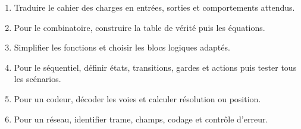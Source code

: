 \documentclass[10pt,a3paper]{article}
\begin{document}
\vfill
\begin{TLPosterMethode}
\begin{enumerate}
  \item Traduire le cahier des charges en entrées, sorties et comportements attendus.
  \item Pour le combinatoire, construire la table de vérité puis les équations.
  \item Simplifier les fonctions et choisir les blocs logiques adaptés.
  \item Pour le séquentiel, définir états, transitions, gardes et actions puis tester tous les scénarios.
  \item Pour un codeur, décoder les voies et calculer résolution ou position.
  \item Pour un réseau, identifier trame, champs, codage et contrôle d'erreur.
\end{enumerate}
\end{TLPosterMethode}
\vfill
{}
\end{document}
